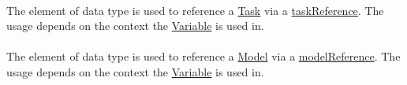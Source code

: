 \paragraph*{}
\label{sec:taskReferenceAttribute}
The  element of data type \hyperref[type:sidref]{} is used to reference a \hyperref[class:task]{Task} via a \hyperref[sec:taskReference]{taskReference}. The usage depends on the context the \hyperref[class:variable]{Variable} is used in.

\paragraph*{}
\label{sec:modelReferenceAttribute}
The  element of data type \hyperref[type:sidref]{} is used to reference a \hyperref[class:model]{Model} via a \hyperref[sec:modelReference]{modelReference}. The usage depends on the context the \hyperref[class:variable]{Variable} is used in.


